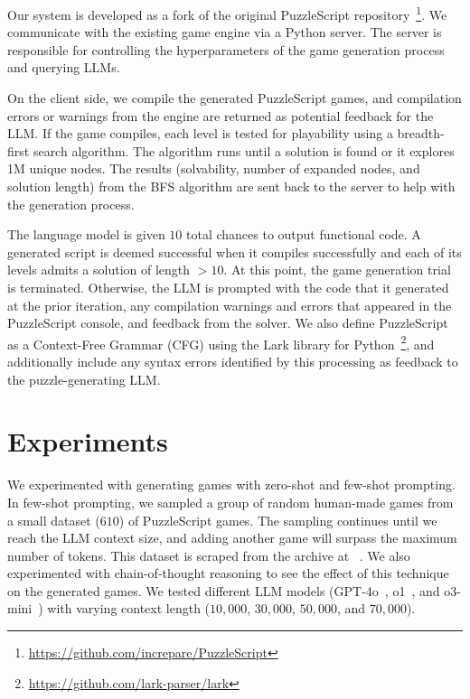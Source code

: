 \documentclass[conference]{IEEEtran}
\begin{document}
Our system is developed as a fork of the original PuzzleScript repository~\footnote{\url{https://github.com/increpare/PuzzleScript}}. We communicate with the existing game engine via a Python server. The server is responsible for controlling the hyperparameters of the game generation process and querying LLMs.

On the client side, we compile the generated PuzzleScript games, and compilation errors or warnings from the engine are returned as potential feedback for the LLM. If the game compiles, each level is tested for playability using a breadth-first search algorithm. The algorithm runs until a solution is found or it explores 1M unique nodes. The results (solvability, number of expanded nodes, and solution length) from the BFS algorithm are sent back to the server to help with the generation process.

The language model is given $10$ total chances to output functional code.
A generated script is deemed successful when it compiles successfully and each of its levels admits a solution of length $>10$.
At this point, the game generation trial is terminated.
Otherwise, the LLM is prompted with the code that it generated at the prior iteration, any compilation warnings and errors that appeared in the PuzzleScript console, and feedback from the solver. We also define PuzzleScript as a Context-Free Grammar (CFG) using the Lark library for Python~\footnote{\url{https://github.com/lark-parser/lark}}, and additionally include any syntax errors identified by this processing as feedback to the puzzle-generating LLM.

\section{Experiments}
We experimented with generating games with zero-shot and few-shot prompting. In few-shot prompting, we sampled a group of random human-made games from a small dataset ($610$) of PuzzleScript games. The sampling continues until we reach the LLM context size, and adding another game will surpass the maximum number of tokens. This dataset is scraped from the archive at ~\cite{pedro2019database}. We also experimented with chain-of-thought reasoning to see the effect of this technique on the generated games. We tested different LLM models (GPT-4o~\cite{gpt4o}, o1~\cite{jaech2024openai}, and o3-mini~\cite{o3-mini}) with varying context length ($10,000$, $30,000$, $50,000$, and $70,000$). 
\end{document}
